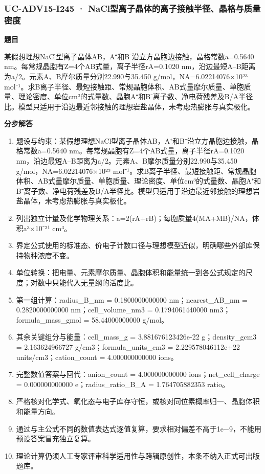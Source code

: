 \documentclass[UTF8,11pt,a4paper]{ctexart}
\begin{document}
\subsubsection*{UC-ADV15-I245 · NaCl型离子晶体的离子接触半径、晶格与质量密度}
\noindent\textbf{题目}\par
某假想理想NaCl型离子晶体AB，A⁺和B⁻沿立方晶胞边接触，晶格常数a=0.5640 nm。每常规晶胞有Z=4个AB式量，离子半径rA=0.1020 nm，沿边最短A–B距离为a/2。元素A、B摩尔质量分别22.990与35.450 g/mol，NA=6.02214076×10²³ mol⁻¹。求B离子半径、最短接触距、常规晶胞体积、AB式量摩尔质量、单胞质量、理论密度、单位cm³的式量数、晶胞A⁺和B⁻离子数、净电荷残差及B/A半径比。模型只适用于沿边最近邻接触的理想岩盐晶体，未考虑热膨胀与真实极化。\par
\medskip\noindent\textbf{分步解答}
\begin{enumerate}
\item 题设与约束：某假想理想NaCl型离子晶体AB，A⁺和B⁻沿立方晶胞边接触，晶格常数a=0.5640 nm。每常规晶胞有Z=4个AB式量，离子半径rA=0.1020 nm，沿边最短A–B距离为a/2。元素A、B摩尔质量分别22.990与35.450 g/mol，NA=6.02214076×10²³ mol⁻¹。求B离子半径、最短接触距、常规晶胞体积、AB式量摩尔质量、单胞质量、理论密度、单位cm³的式量数、晶胞A⁺和B⁻离子数、净电荷残差及B/A半径比。模型只适用于沿边最近邻接触的理想岩盐晶体，未考虑热膨胀与真实极化。
\item 列出独立计量及化学物理关系：a=2(rA+rB)；每胞质量4(MA+MB)/NA，体积a³×10⁻²¹ cm³。
\item 界定公式使用的标准态、价电子计数口径与理想模型近似，明确哪些外部库保持物种浓度不变。
\item 单位转换：把电量、元素摩尔质量、晶胞体积和能量统一到各公式规定的尺度；对数中只能代入无量纲的活度比。
\item 第一组计算：radius\_B\_nm = 0.1800000000000 nm；nearest\_AB\_nm = 0.2820000000000 nm；cell\_volume\_nm3 = 0.1794061440000 nm3；formula\_mass\_gmol = 58.44000000000 g/mol。
\item 其余关键组分与能量：cell\_mass\_g = 3.881676123426e-22 g；density\_gcm3 = 2.163624966727 g/cm3；formula\_units\_cm3 = 2.229578046112e+22 units/cm3；cation\_count = 4.000000000000 ions。
\item 完整数值答案与回代：anion\_count = 4.000000000000 ions；net\_cell\_charge = 0.000000000000 e；radius\_ratio\_B\_A = 1.764705882353 ratio。
\item 严格核对化学式、氧化态与电子库存守恒，或核对同位素概率归一、晶胞体积和能量方向。
\item 通过与主公式不同的数值表达式逐值复算，要求相对偏差不高于1e−9，不能用预设答案冒充独立复算。
\item 理论计算仍须人工专家评审科学适用性与跨辑原创性，本条不纳入正式可出版题库。
\end{enumerate}
\end{document}

